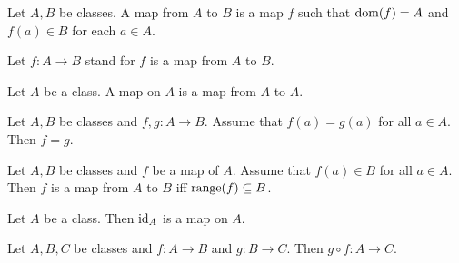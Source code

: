 \documentclass[10pt]{article}
\begin{document}
  \begin{forthel}
    \begin{definition}
      Let $A, B$ be classes.
      A map from $A$ to $B$ is a map $f$ such that $\operatorname{dom}(f) = A$ and
      $f(a) \in B$ for each $a \in A$.
    \end{definition}

    Let $f: A \to B$ stand for $f$ is a map from $A$ to $B$.
  \end{forthel}

  \begin{forthel}
    \begin{definition}
      Let $A$ be a class.
      A map on $A$ is a map from $A$ to $A$.
    \end{definition}
  \end{forthel}

  \begin{forthel}
    \begin{proposition}
      Let $A, B$ be classes and $f, g : A \to B$.
      Assume that $f(a) = g(a)$ for all $a \in A$.
      Then $f = g$.
    \end{proposition}
  \end{forthel}

  \begin{forthel}
    \begin{proposition}
      Let $A, B$ be classes and $f$ be a map of $A$.
      Assume that $f(a) \in B$ for all $a \in A$.
      Then $f$ is a map from $A$ to $B$ iff $\textrm{range}(f) \subseteq B$.
    \end{proposition}
  \end{forthel}

  \begin{forthel}
    \begin{proposition}
      Let $A$ be a class.
      Then $\textrm{id}_{A}$ is a map on $A$.
    \end{proposition}
  \end{forthel}

  \begin{forthel}
    \begin{proposition}
      Let $A, B, C$ be classes and $f : A \to B$ and $g : B \to C$.
      Then $g \circ f : A \to C$.
    \end{proposition}
  \end{forthel}
\end{document}
